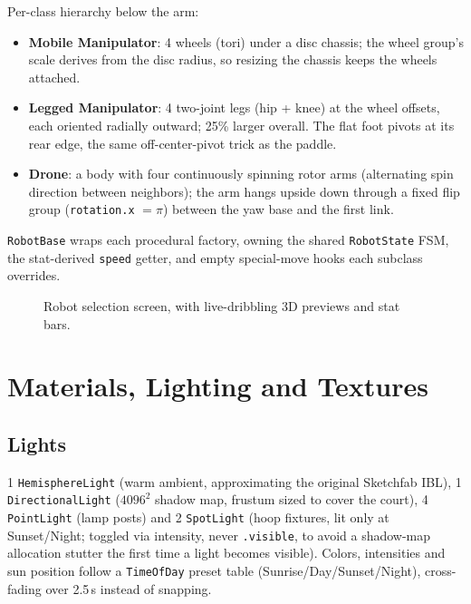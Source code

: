 \documentclass[11pt,a4paper]{article}
\newcommand{\code}[1]{\texttt{#1}}
\newcommand{\figplaceholder}[1]{%
  \fbox{\parbox{0.85\textwidth}{\centering\vspace{1em}\textcolor{red}{TODO: figure. #1}\vspace{1em}}}}
\begin{document}
Per-class hierarchy below the arm:
\begin{itemize}[nosep]
    \item \textbf{Mobile Manipulator}: 4 wheels (tori) under a disc chassis; the wheel group's scale derives from the disc radius, so resizing the chassis keeps the wheels attached.
    \item \textbf{Legged Manipulator}: 4 two-joint legs (hip + knee) at the wheel offsets, each oriented radially outward; 25\% larger overall. The flat foot pivots at its rear edge, the same off-center-pivot trick as the paddle.
    \item \textbf{Drone}: a body with four continuously spinning rotor arms (alternating spin direction between neighbors); the arm hangs upside down through a fixed flip group (\code{rotation.x} $= \pi$) between the yaw base and the first link.
\end{itemize}

\code{RobotBase} wraps each procedural factory, owning the shared \code{RobotState} FSM, the stat-derived \code{speed} getter, and empty special-move hooks each subclass overrides.

\begin{figure}[htbp]
\centering
\figplaceholder{Main Menu robot selection screen, 3 cards with live 3D preview}
\caption{Robot selection screen, with live-dribbling 3D previews and stat bars.}
\end{figure}

\section{Materials, Lighting and Textures}
\label{sec:materials}

\subsection{Lights}

1 \code{HemisphereLight} (warm ambient, approximating the original Sketchfab IBL), 1 \code{DirectionalLight} ($4096^2$ shadow map, frustum sized to cover the court), 4 \code{PointLight} (lamp posts) and 2 \code{SpotLight} (hoop fixtures, lit only at Sunset/Night; toggled via intensity, never \code{.visible}, to avoid a shadow-map allocation stutter the first time a light becomes visible). Colors, intensities and sun position follow a \code{TimeOfDay} preset table (Sunrise/Day/Sunset/Night), cross-fading over 2.5\,s instead of snapping.
\end{document}
